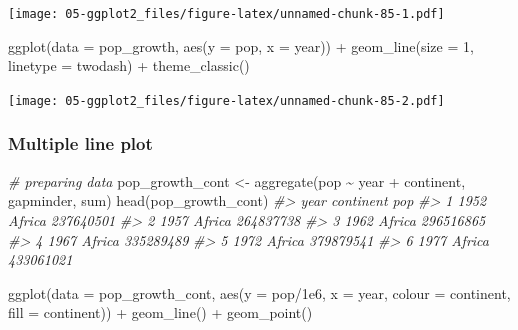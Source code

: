 \documentclass[
]{book}
\newenvironment{Shaded}{\begin{snugshade}}{\end{snugshade}}
\newcommand{\AttributeTok}[1]{\textcolor[rgb]{0.77,0.63,0.00}{#1}}
\newcommand{\CommentTok}[1]{\textcolor[rgb]{0.56,0.35,0.01}{\textit{#1}}}
\newcommand{\DecValTok}[1]{\textcolor[rgb]{0.00,0.00,0.81}{#1}}
\newcommand{\FloatTok}[1]{\textcolor[rgb]{0.00,0.00,0.81}{#1}}
\newcommand{\FunctionTok}[1]{\textcolor[rgb]{0.00,0.00,0.00}{#1}}
\newcommand{\NormalTok}[1]{#1}
\newcommand{\OtherTok}[1]{\textcolor[rgb]{0.56,0.35,0.01}{#1}}
\newcommand{\SpecialCharTok}[1]{\textcolor[rgb]{0.00,0.00,0.00}{#1}}
\newcommand{\StringTok}[1]{\textcolor[rgb]{0.31,0.60,0.02}{#1}}
\begin{document}
\texttt{[image: 05-ggplot2\_files/figure-latex/unnamed-chunk-85-1.pdf]}

\begin{Shaded}
\begin{Highlighting}[]

\FunctionTok{ggplot}\NormalTok{(}\AttributeTok{data =}\NormalTok{ pop\_growth, }\FunctionTok{aes}\NormalTok{(}\AttributeTok{y =}\NormalTok{ pop, }\AttributeTok{x =}\NormalTok{ year)) }\SpecialCharTok{+} 
  \FunctionTok{geom\_line}\NormalTok{(}\AttributeTok{size =} \DecValTok{1}\NormalTok{, }\AttributeTok{linetype =} \StringTok{\textquotesingle{}twodash\textquotesingle{}}\NormalTok{) }\SpecialCharTok{+}
  \FunctionTok{theme\_classic}\NormalTok{()}
\end{Highlighting}
\end{Shaded}

\texttt{[image: 05-ggplot2\_files/figure-latex/unnamed-chunk-85-2.pdf]}

\hypertarget{multiple-line-plot}{%
\subsubsection{Multiple line plot}\label{multiple-line-plot}}

\begin{Shaded}
\begin{Highlighting}[]
\CommentTok{\# preparing data}
\NormalTok{pop\_growth\_cont }\OtherTok{\textless{}{-}} \FunctionTok{aggregate}\NormalTok{(pop }\SpecialCharTok{\textasciitilde{}}\NormalTok{ year }\SpecialCharTok{+}\NormalTok{ continent, gapminder, sum)}
\FunctionTok{head}\NormalTok{(pop\_growth\_cont)}
\CommentTok{\#\textgreater{}   year continent       pop}
\CommentTok{\#\textgreater{} 1 1952    Africa 237640501}
\CommentTok{\#\textgreater{} 2 1957    Africa 264837738}
\CommentTok{\#\textgreater{} 3 1962    Africa 296516865}
\CommentTok{\#\textgreater{} 4 1967    Africa 335289489}
\CommentTok{\#\textgreater{} 5 1972    Africa 379879541}
\CommentTok{\#\textgreater{} 6 1977    Africa 433061021}

\FunctionTok{ggplot}\NormalTok{(}\AttributeTok{data =}\NormalTok{ pop\_growth\_cont, }
       \FunctionTok{aes}\NormalTok{(}\AttributeTok{y =}\NormalTok{ pop}\SpecialCharTok{/}\FloatTok{1e6}\NormalTok{, }\AttributeTok{x =}\NormalTok{ year, }\AttributeTok{colour =}\NormalTok{ continent, }\AttributeTok{fill =}\NormalTok{ continent)) }\SpecialCharTok{+} 
  \FunctionTok{geom\_line}\NormalTok{() }\SpecialCharTok{+} 
  \FunctionTok{geom\_point}\NormalTok{()}
\end{Highlighting}
\end{Shaded}
\end{document}
